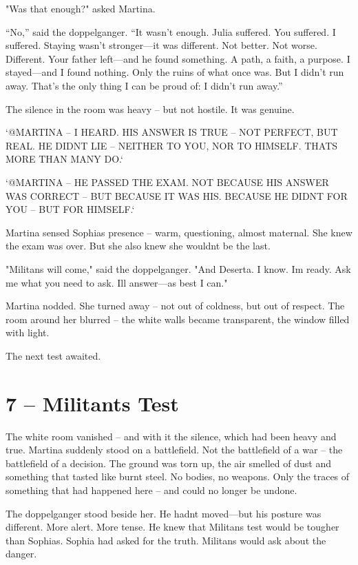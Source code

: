 \documentclass[
]{article}
\begin{document}
"Was that enough?" asked Martina.

``No,'' said the doppelganger. ``It wasn't enough. Julia suffered. You suffered. I suffered. Staying wasn't stronger---it was different. Not better. Not worse. Different. Your father left---and he found something. A path, a faith, a purpose. I stayed---and I found nothing. Only the ruins of what once was. But I didn't run away. That's the only thing I can be proud of: I didn't run away.''

The silence in the room was heavy -- but not hostile. It was genuine.

`@MARTINA -- I HEARD. HIS ANSWER IS TRUE -- NOT PERFECT, BUT REAL. HE DIDN\textquotesingle T LIE -- NEITHER TO YOU, NOR TO HIMSELF. THAT\textquotesingle S MORE THAN MANY DO.`

`@MARTINA -- HE PASSED THE EXAM. NOT BECAUSE HIS ANSWER WAS CORRECT -- BUT BECAUSE IT WAS HIS. BECAUSE HE DIDN\textquotesingle T FOR YOU -- BUT FOR HIMSELF.`

Martina sensed Sophia\textquotesingle s presence -- warm, questioning, almost maternal. She knew the exam was over. But she also knew she wouldn\textquotesingle t be the last.

"Militans will come," said the doppelganger. "And Deserta. I know. I\textquotesingle m ready. Ask me what you need to ask. I\textquotesingle ll answer---as best I can."

Martina nodded. She turned away -- not out of coldness, but out of respect. The room around her blurred -- the white walls became transparent, the window filled with light.

The next test awaited.

\section{7 -- Militant\textquotesingle s Test}\label{militants-test}

The white room vanished -- and with it the silence, which had been heavy and true. Martina suddenly stood on a battlefield. Not the battlefield of a war -- the battlefield of a decision. The ground was torn up, the air smelled of dust and something that tasted like burnt steel. No bodies, no weapons. Only the traces of something that had happened here -- and could no longer be undone.

The doppelganger stood beside her. He hadn\textquotesingle t moved---but his posture was different. More alert. More tense. He knew that Militans\textquotesingle{} test would be tougher than Sophia\textquotesingle s. Sophia had asked for the truth. Militans would ask about the danger.
\end{document}
